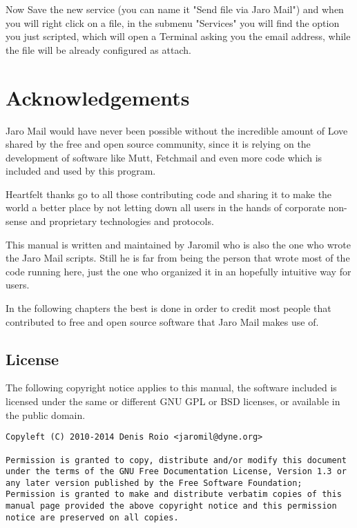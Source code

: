 \documentclass[a4,onecolumn,portrait]{article}
\begin{document}
Now Save the new service (you can name it "Send file via Jaro
Mail") and when you will right click on a file, in the submenu
"Services" you will find the option you just scripted, which will
open a Terminal asking you the email address, while the file will
be already configured as attach.



\section{Acknowledgements}
\label{sec-12}

Jaro Mail would have never been possible without the incredible amount
of Love shared by the free and open source community, since it is
relying on the development of software like Mutt, Fetchmail and even
more code which is included and used by this program.

Heartfelt thanks go to all those contributing code and sharing it to
make the world a better place by not letting down all users in the
hands of corporate non-sense and proprietary technologies and
protocols.

This manual is written and maintained by Jaromil who is also the one
who wrote the Jaro Mail scripts. Still he is far from being the person
that wrote most of the code running here, just the one who organized
it in an hopefully intuitive way for users.

In the following chapters the best is done in order to credit most
people that contributed to free and open source software that Jaro
Mail makes use of.

\subsection{License}
\label{sec-12-1}

The following copyright notice applies to this manual, the software
included is licensed under the same or different GNU GPL or BSD
licenses, or available in the public domain.

\begin{verbatim}
Copyleft (C) 2010-2014 Denis Roio <jaromil@dyne.org>

Permission is granted to copy, distribute and/or modify this document
under the terms of the GNU Free Documentation License, Version 1.3 or
any later version published by the Free Software Foundation;
Permission is granted to make and distribute verbatim copies of this
manual page provided the above copyright notice and this permission
notice are preserved on all copies.
\end{verbatim}
\end{document}
